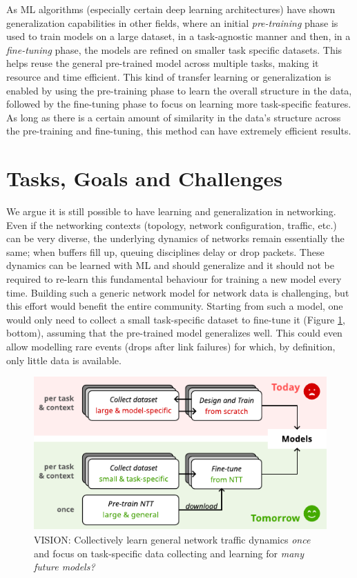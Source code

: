 As ML algorithms (especially certain deep learning architectures) have shown generalization capabilities\cite{generalizingdnn} in other fields, where an initial \emph{pre-training} phase is used to train models on a large dataset, in a task-agnostic manner and then, in a \emph{fine-tuning} phase, the models are refined on smaller task specific datasets. This helps reuse the general pre-trained model across multiple tasks, making it resource and time efficient. This kind of transfer learning or generalization is enabled by using the pre-training phase to learn the overall structure in the data, followed by the fine-tuning phase to focus on learning more task-specific features. As long as there is a certain amount of similarity in the data's structure across the pre-training and fine-tuning, this method can have extremely efficient results.

\section{Tasks, Goals and Challenges}
\label{sec:task}

We argue it is still possible to have learning and generalization in networking. Even if the networking contexts (topology, network configuration, traffic, etc.) can be very diverse, the underlying dynamics of networks remain essentially the same; \eg when buffers fill up, queuing disciplines delay or drop packets. These dynamics can be learned with ML and should generalize and it should not be required to re-learn this fundamental behaviour for training a new model every time. Building such a generic network model for network data is challenging, but this effort would benefit the entire community. Starting from such a model, one would only need to collect a small task-specific dataset to fine-tune it (Figure \ref{fig:vision}, bottom), assuming that the pre-trained model generalizes well. This could even allow modelling rare events (\eg drops after link failures) for which, by definition, only little data is available.

\begin{figure}
    \centering
    \includegraphics[scale=1.3]{figures/vision}
    \caption{VISION: Collectively learn general network traffic dynamics \emph{once} and focus on task-specific data collecting and learning  for \emph{many future models?}}
    \label{fig:vision}
\end{figure}


